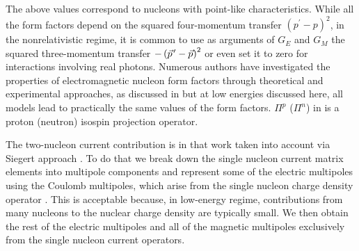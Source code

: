     The above values correspond to nucleons with point-like characteristics. While all the form factors depend on the squared
    four-momentum transfer $\left(p^{\prime}-p\right)^2$, in the nonrelativistic regime, it is common to use
    as arguments of $G_E$ and $G_M$ the squared
    three-momentum transfer $-\left(\pvec{p}-\vec{p}\right)^2$ or even set it to zero for interactions involving
    real photons. Numerous authors have investigated the properties of electromagnetic nucleon form factors through
    theoretical and experimental approaches, as discussed in \cite{Arrington_2007, JOURDAN1999513c}
    but at low energies discussed here, all models lead to practically the same values of the form factors.
    $\Pi^p$ ($\Pi^n$) in  is a proton (neutron) isospin projection operator.

    The two-nucleon current contribution is in that work taken into account via Siegert approach \cite{Siegert, GolakKamad2000_ExplDescr, Golak2005}.
    To do that we break down the single nucleon current matrix elements into multipole components and 
    represent some of the electric multipoles using the Coulomb multipoles,
    which arise from the single nucleon charge density operator \cite{Golak2005}.
    This is acceptable because, in low-energy regime, contributions from many nucleons to the nuclear charge density are typically small.
    We then obtain the rest of the electric multipoles and all of the magnetic multipoles exclusively from the single nucleon current operators.

